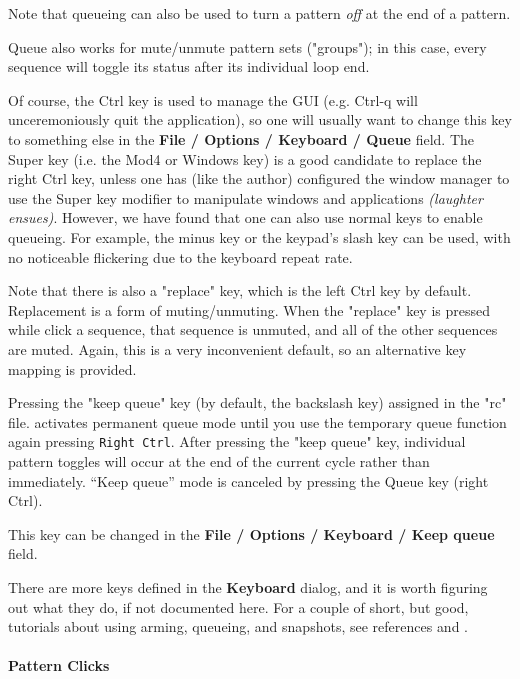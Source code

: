    Note that queueing can also be used to turn a pattern \textsl{off}
   at the end of a pattern.

   Queue also works for mute/unmute pattern sets ("groups"); in this case,
   every sequence will toggle its status after its individual loop end. 

   Of course, the Ctrl key is used to manage the GUI (e.g. Ctrl-q will
   unceremoniously quit the application), so one will usually want to change
   this key to something else in the
   \textbf{File / Options / Keyboard / Queue} field.
   The Super key (i.e. the Mod4 or Windows key) is a good candidate to
   replace the right Ctrl key, unless one has (like the author) configured
   the window manager to use the Super key modifier to manipulate windows
   and applications \textsl{(laughter ensues)}.
   However, we have found that one can also use normal keys to enable queueing.
   For example, the minus key or the keypad's slash key can be used, with no
   noticeable flickering due to the keyboard repeat rate.

   Note that there is also a "replace" key, which is the left Ctrl key by
   default.  Replacement is a form of muting/unmuting.  When the "replace"
   key is pressed while click a sequence, that sequence is unmuted, and all
   of the other sequences are muted.  Again, this is a very inconvenient
   default, so an alternative key mapping is provided.

	Pressing the "keep queue" key (by default, the backslash key)
   assigned in the "rc" file.
	activates permanent queue mode until you use the temporary 
	queue function again pressing \texttt{Right Ctrl}. 
   After pressing the "keep queue" key, individual pattern
   toggles will occur at the end of the current cycle rather than immediately.
   “Keep queue” mode is canceled by pressing the Queue key (right Ctrl).

   This key can be changed in the
   \textbf{File / Options / Keyboard / Keep queue} field.

   There are more keys defined in the \textbf{Keyboard} dialog, and it is
   worth figuring out what they do, if not documented here.
   For a couple of short, but good, tutorials about using arming, queueing,
   and snapshots, see references \cite{wootangent1}
   and \cite{wootangent2}.

\paragraph{Pattern Clicks}
\label{paragraph:seq64_patterns_pattern_Clicks}

